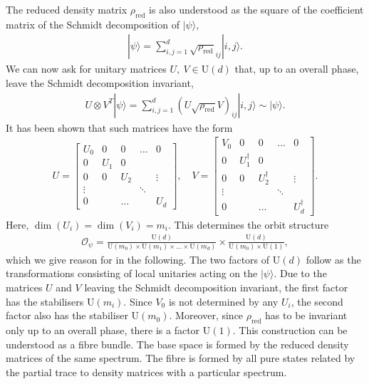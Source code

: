 \documentclass[a4paper,11pt]{article}
\newcommand{\U}{\text{U}}
\newcommand{\1}{\mathds{1}}
\begin{document}
The reduced density matrix $\rho_{\text{red}}$ is also understood as the square of the coefficient matrix of the Schmidt decomposition of $|\psi\rangle$,
\begin{align}
    |\psi\rangle=\sum_{i,j=1}^d\sqrt{\rho_{\text{red}}}_{ij}|i,j\rangle.
\end{align}
We can now ask for unitary matrices $U,~V\in\U(d)$ that, up to an overall phase, leave the Schmidt decomposition invariant,
\begin{align}
    U\otimes V^T|\psi\rangle=\sum_{i,j=1}^d(U\sqrt{\rho_{\text{red}}} V)_{ij}|i,j\rangle\sim|\psi\rangle.
\end{align}
It has been shown \cite{Sinolecka2002manifolds} that such matrices have the form
\begin{align}
    U=\begin{bmatrix}
        U_0 & 0 & 0 & \dots & 0 \\
        0 & U_1 & 0 &   &   \\
        0 & 0 & U_2 &   & \vdots \\
        \vdots &   &   & \ddots &   \\
        0 &   & \dots &   & U_d
    \end{bmatrix},\quad V=\begin{bmatrix}
        V_0 & 0 & 0 & \dots & 0 \\
        0 & U_1^\dagger & 0 &   &   \\
        0 & 0 & U_2^\dagger &   & \vdots \\
        \vdots &   &   & \ddots &   \\
        0 &   & \dots &   & U_d^\dagger
    \end{bmatrix}.
\end{align}
Here, $\dim(U_i)=\dim(V_i)=m_i$. This determines the orbit structure
\begin{align}
    \mathcal{O}_\psi=\frac{\U(d)}{\U(m_0)\times\U(m_1)\times...\times\U(m_d)}\times\frac{\U(d)}{\U(m_0)\times\U(1)},\label{eq:general_orbit}
\end{align}
which we give reason for in the following. The two factors of $\U(d)$ follow as the transformations consisting of local unitaries acting on the $|\psi\rangle$. Due to the matrices $U$ and $V$ leaving the Schmidt decomposition invariant, the first factor has the stabilisers $\U(m_i)$. Since $V_0$ is not determined by any $U_i$, the second factor also has the stabiliser $\U(m_0)$. Moreover, since $\rho_{\text{red}}$ has to be invariant only up to an overall phase, there is a factor $\U(1)$. This construction can be understood as a fibre bundle. The base space is formed by the reduced density matrices of the same spectrum. The fibre is formed by all pure states related by the partial trace to density matrices with a particular spectrum.
\end{document}
